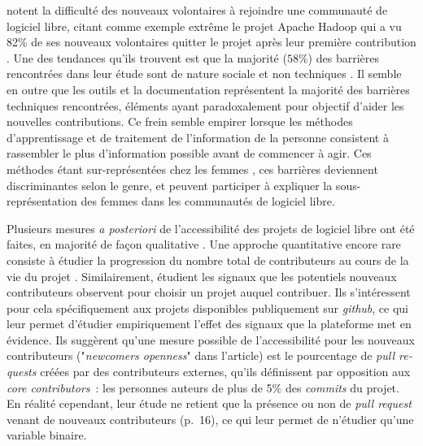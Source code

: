 \documentclass[dvipsnames,runningheads]{llncs}
\newcommand{\en}[1]{\foreignlanguage{english}{\emph{#1}}}
\begin{document}
    \textcite{barriers-2018} notent la difficulté des nouveaux volontaires à rejoindre une communauté de
    logiciel libre, citant comme exemple extrême le projet Apache Hadoop qui a vu 82\% de ses nouveaux
    volontaires quitter le projet après leur première contribution \parencite{hadoop-dropout-2013}. Une des
    tendances qu'ils trouvent est que la majorité ($58\%$) des barrières rencontrées dans leur étude sont de
    nature sociale et non techniques \parencite[p.~1008]{barriers-2018}. Il semble en outre que les outils et
    la documentation représentent la majorité des barrières techniques rencontrées, éléments ayant
    paradoxalement pour objectif d'aider les nouvelles contributions. Ce frein semble empirer lorsque les
    méthodes d'apprentissage et de traitement de l'information de la personne consistent à rassembler le plus
    d'information possible avant de commencer à agir. Ces méthodes étant sur-représentées chez les femmes
    \parencite{gender-information-processing-1995,gender-information-processing-2015}, ces barrières
    deviennent discriminantes selon le genre, et peuvent participer à expliquer la sous-représentation des
    femmes dans les communautés de logiciel libre.

    \label{sec:accessibility-measure}
    Plusieurs mesures \emph{a posteriori} de l'accessibilité des projets de logiciel libre ont été faites, en
    majorité de façon qualitative
    \parencites{newcomers-accessibility-2016}{newcomers-onboarding-2018}{newcomers-adaptation-2005}. Une
    approche quantitative encore rare consiste à étudier la progression du nombre total de contributeurs au
    cours de la vie du projet \cite{contributor-count-2006}. Similairement, \textcite{signals-2019} étudient
    les signaux que les potentiels nouveaux contributeurs observent pour choisir un projet auquel contribuer.
    Ils s'intéressent pour cela spécifiquement aux projets disponibles publiquement sur \en{github}, ce qui
    leur permet d'étudier empiriquement l'effet des signaux que la plateforme met en évidence. Ils suggèrent
    qu'une mesure possible de l'accessibilité pour les nouveaux contributeurs ("\en{newcomers openness}" dans
    l'article) est le pourcentage de \en{pull requests} créées par des contributeurs externes, qu'ils
    définissent par opposition aux \en{core contributors} : les personnes auteurs de plus de 5\% des
    \en{commits} du projet. En réalité cependant, leur étude ne retient que la présence ou non de \en{pull
    request} venant de nouveaux contributeurs (p.~16), ce qui leur permet de n'étudier qu'une variable
    binaire.
\end{document}
